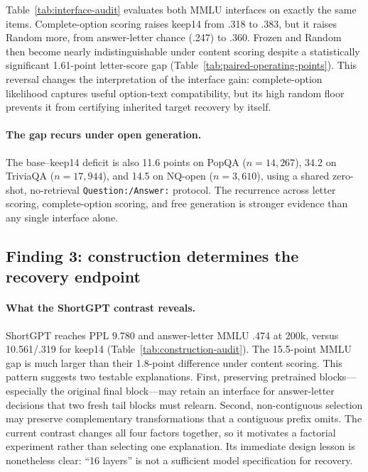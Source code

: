 Table~\ref{tab:interface-audit} evaluates both MMLU interfaces on exactly the
same items. Complete-option scoring raises keep14 from .318 to .383, but it
raises Random more, from answer-letter chance (.247) to .360. Frozen and Random
then become nearly indistinguishable under content scoring despite a
statistically significant 1.61-point letter-score gap
(Table~\ref{tab:paired-operating-points}). This reversal changes the interpretation
of the interface gain: complete-option likelihood captures useful option-text
compatibility, but its high random floor prevents it from certifying inherited
target recovery by itself.

\paragraph{The gap recurs under open generation.}
The base--keep14 deficit is also 11.6 points on PopQA
($n{=}14{,}267$), 34.2 on TriviaQA ($n{=}17{,}944$), and 14.5 on NQ-open
($n{=}3{,}610$), using a shared zero-shot, no-retrieval
\texttt{Question:/Answer:} protocol. The recurrence across letter scoring,
complete-option scoring, and free generation is stronger evidence than any
single interface alone.

\subsection{Finding 3: construction determines the recovery endpoint}


\paragraph{What the ShortGPT contrast reveals.}
ShortGPT reaches PPL 9.780 and answer-letter MMLU .474 at 200k, versus
10.561/.319 for keep14 (Table~\ref{tab:construction-audit}). The 15.5-point
MMLU gap is much larger than their 1.8-point difference under content scoring.
This pattern suggests two testable explanations. First, preserving pretrained
blocks---especially the original final block---may retain an interface for
answer-letter decisions that two fresh tail blocks must relearn. Second,
non-contiguous selection may preserve complementary transformations that a
contiguous prefix omits. The current contrast changes all four factors
together, so it motivates a factorial experiment rather than selecting one
explanation. Its immediate design lesson is nonetheless clear: ``16 layers''
is not a sufficient model specification for recovery.

